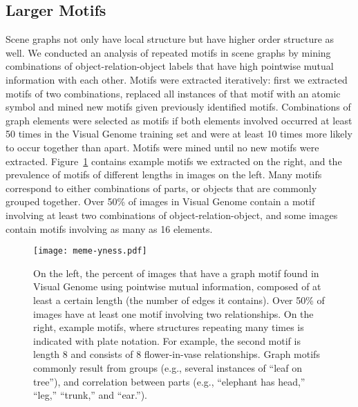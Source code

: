 \documentclass[10pt,twocolumn,letterpaper]{article}
\begin{document}
\subsection{Larger Motifs}

Scene graphs not only have local structure but have higher order structure as well.
We conducted an analysis of repeated motifs in scene graphs by mining combinations of object-relation-object labels that have high pointwise mutual information with each other.
Motifs were extracted iteratively: first we extracted motifs of two combinations, replaced all instances of that motif with an atomic symbol and mined new motifs given previously identified motifs.
Combinations of graph elements were selected as motifs if both elements involved occurred at least 50 times in the Visual Genome training set and were at least 10 times more likely to occur together than apart.
Motifs were mined until no new motifs were extracted.
Figure~\ref{fig:motifs} contains example motifs we extracted on the right, and the prevalence of motifs of different lengths in images on the left.
Many motifs correspond to either combinations of parts, or objects that are commonly grouped together.
Over 50\% of images in Visual Genome contain a motif involving at least two combinations of object-relation-object, and some images contain motifs involving as many as 16 elements.

\begin{figure}[t]
    \vspace{-.3cm}
    \centering
    \texttt{[image: meme-yness.pdf]}
    \caption{On the left, the percent of images that have a graph motif found in Visual Genome using pointwise mutual information, composed of at least a certain length (the number of edges it contains). Over 50\% of images have at least one motif involving two relationships. On the right, example motifs, where structures repeating many times is indicated with plate notation. For example, the second motif is length 8 and consists of 8 flower-in-vase relationships. Graph motifs commonly result from groups (e.g., several instances of ``leaf on tree''), and correlation between parts (e.g., ``elephant has head,'' ``leg,'' ``trunk,'' and ``ear.''). }
    \label{fig:motifs}
\end{figure}%
\end{document}
